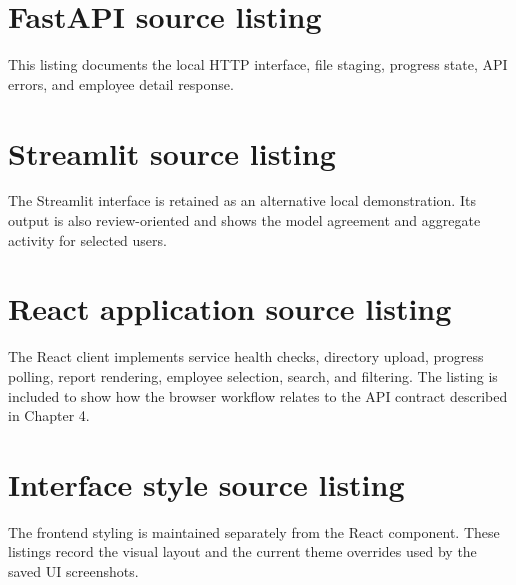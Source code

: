 \clearpage


\section{FastAPI source listing}
\label{app:api-source}
This listing documents the local HTTP interface, file staging,
progress state, API errors, and employee detail response.

\clearpage


\section{Streamlit source listing}
\label{app:streamlit-source}
The Streamlit interface is retained as an alternative local
demonstration. Its output is also review-oriented and shows the model
agreement and aggregate activity for selected users.

\clearpage


\section{React application source listing}
\label{app:react-source}
The React client implements service health checks, directory upload,
progress polling, report rendering, employee selection, search, and
filtering. The listing is included to show how the browser workflow
relates to the API contract described in Chapter 4.

\clearpage


\section{Interface style source listing}
\label{app:style-source}
The frontend styling is maintained separately from the React
component. These listings record the visual layout and the current
theme overrides used by the saved UI screenshots.

\clearpage


\clearpage

\label{app:end-content}
